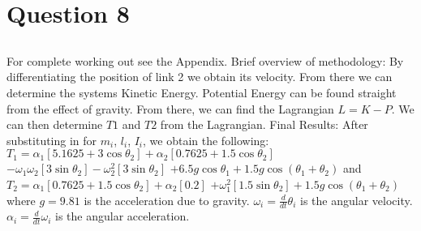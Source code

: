 \newpage
\section{Question 8}
	\subsection{}
	For complete working out see the Appendix.
	\newline Brief overview of methodology:\newline
	By differentiating the position of link 2 we obtain its velocity. From there we can determine the systems Kinetic Energy.\newline
	Potential Energy can be found straight from the effect of gravity.\newline
	From there, we can find the Lagrangian $L = K - P$.\newline
	We can then determine $T1$ and $T2$ from the Lagrangian.\newline
	\newline
	Final Results:\newline
	After substituting in for $m_{i}$, $l_{i}$, $I_{i}$, we obtain the following:\newline \newline
	\hspace{20mm}$T_{1} = \alpha _{1} [5.1625 + 3\cos \theta _{2}] + \alpha _{2} [0.7625 + 1.5\cos \theta _{2}]$\newline
	\hspace{30mm}$ - \omega _{1} \omega _{2} [3\sin \theta _{2}] - \omega ^2 _{2}[3\sin \theta _{2}] $\newline
	\hspace{40mm}$ + 6.5g\cos \theta _{1} + 1.5g\cos (\theta _{1} + \theta _{2})$\newline\newline
	and\newline\newline
	\hspace{20mm}$T_{2} = \alpha _{1} [0.7625 + 1.5\cos \theta _{2}] + \alpha _{2} [0.2]$\newline
	\hspace{30mm}$ + \omega ^2 _{1}[1.5\sin \theta _{2}] + 1.5g\cos (\theta _{1} + \theta _{2})$\newline\newline
	where\newline\newline
		$g = 9.81$ is the acceleration due to gravity.\newline
		$\omega _{i} = \frac{d}{dt} \theta _{i}$ is the angular velocity.\newline
		$\alpha _{i} = \frac{d}{dt} \omega _{i}$ is the angular acceleration.\newline
	\pagebreak	
